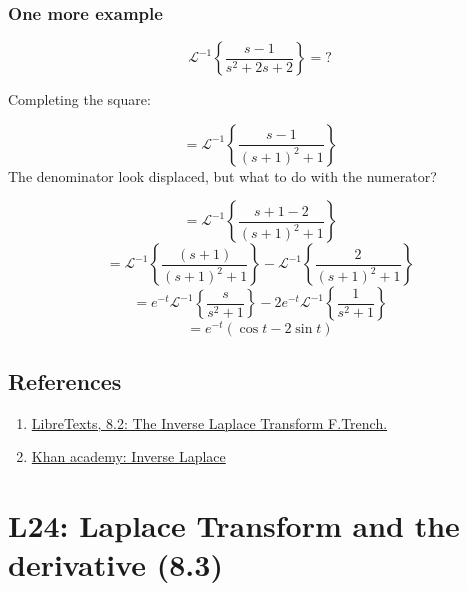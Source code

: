 \documentclass[
  letterpaper,
  DIV=11,
  numbers=noendperiod]{scrreprt}
\theoremstyle{plain}
\theoremstyle{remark}
\begin{document}
\subsection{One more example}\label{one-more-example}

\begin{tcolorbox}[enhanced jigsaw, title=\textcolor{quarto-callout-tip-color}{\faLightbulb}\hspace{0.5em}{Example}, colbacktitle=quarto-callout-tip-color!10!white, opacitybacktitle=0.6, opacityback=0, rightrule=.15mm, breakable, titlerule=0mm, colback=white, bottomtitle=1mm, colframe=quarto-callout-tip-color-frame, toprule=.15mm, leftrule=.75mm, toptitle=1mm, arc=.35mm, bottomrule=.15mm, left=2mm, coltitle=black]

\[\mathscr{L}^{-1}\left\{\frac{s-1}{s^2+2s+2}\right\}=?\]

Completing the square:

\[=\mathscr{L}^{-1}\left\{\frac{s-1}{(s+1)^2+1}\right\}\] The
denominator look displaced, but what to do with the numerator?

\[=\mathscr{L}^{-1}\left\{\frac{s+1-2}{(s+1)^2+1}\right\}\]
\[=\mathscr{L}^{-1}\left\{\frac{(s+1)}{(s+1)^2+1}\right\}-\mathscr{L}^{-1}\left\{\frac{2}{(s+1)^2+1}\right\}\]
\[=e^{-t}\mathscr{L}^{-1}\left\{\frac{s}{s^2+1}\right\}-2e^{-t}\mathscr{L}^{-1}\left\{\frac{1}{s^2+1}\right\}\]
\[=e^{-t}\left(\cos t-2\sin t\right)\]

\end{tcolorbox}

\section{References}\label{references-5}

\begin{enumerate}
\def\labelenumi{\arabic{enumi}.}
\item
  \href{https://math.libretexts.org/Courses/Monroe_Community_College/MTH_225_Differential_Equations/8\%3A_Laplace_Transforms/8.2\%3A_The_Inverse_Laplace_Transform}{LibreTexts,
  8.2: The Inverse Laplace Transform F.Trench.}
\item
  \href{https://youtu.be/BbqbvSig6Mc?feature=shared}{Khan academy:
  Inverse Laplace}
\end{enumerate}


\chapter{L24: Laplace Transform and the derivative
(8.3)}\label{l24-laplace-transform-and-the-derivative-8.3-1}
\end{document}
